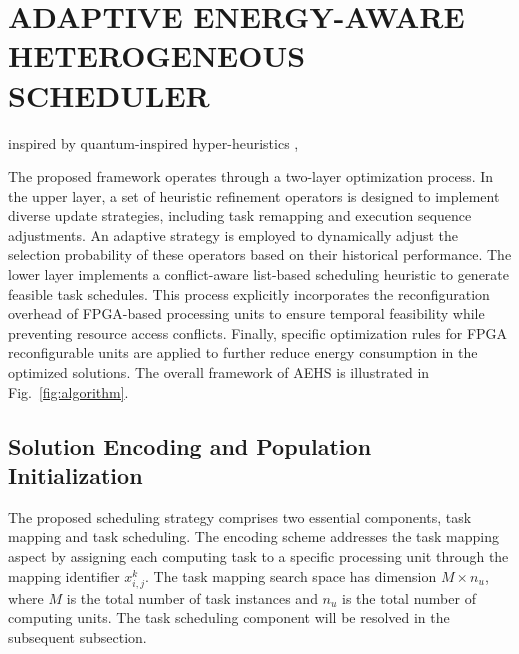 \documentclass{IEEEtaes}
\begin{document}
\section{ADAPTIVE ENERGY-AWARE HETEROGENEOUS SCHEDULER}
\label{sec:alg}
 inspired by quantum-inspired hyper-heuristics \cite{b11}, 

The proposed framework operates through a two-layer optimization process. In the upper layer, a set of heuristic refinement operators is designed to implement diverse update strategies, including task remapping and execution sequence adjustments. An adaptive strategy is employed to dynamically adjust the selection probability of these operators based on their historical performance. The lower layer implements a conflict-aware list-based scheduling heuristic to generate feasible task schedules. This process explicitly incorporates the reconfiguration overhead of FPGA-based processing units to ensure temporal feasibility while preventing resource access conflicts.  Finally, specific optimization rules for FPGA reconfigurable units are applied to further reduce energy consumption in the optimized solutions. The overall framework of AEHS is illustrated in Fig.~\ref{fig:algorithm}.

\subsection{Solution Encoding and Population Initialization}
\label{subsec:encode}

The proposed scheduling strategy comprises two essential components, task mapping and task scheduling. The encoding scheme addresses the task mapping aspect by assigning each computing task to a specific processing unit through the mapping identifier $x_{i,j}^{k}$. The task mapping search space has dimension $M\times n_u$, where $M$ is the total number of task instances and $n_u$ is the total number of computing units. The task scheduling component will be resolved in the subsequent subsection.
\end{document}
